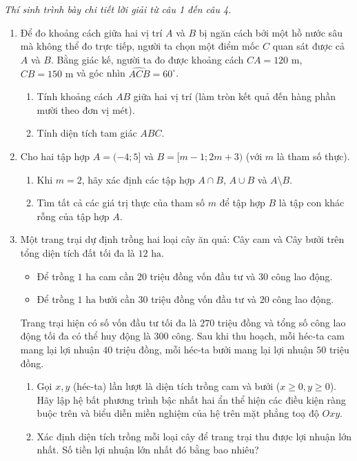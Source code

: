 \documentclass[12pt,a4paper]{article}
\newcommand{\parttitle}[1]{\par\vspace{1.5pt}\needspace{2\baselineskip}{\large\bfseries\color{ink}#1}\par\nopagebreak\vspace{1pt}}
\begin{document}
\parttitle{PHẦN IV. Tự luận}
\textit{Thí sinh trình bày chi tiết lời giải từ câu 1 đến câu 4.}
\begin{enumerate}
\item Để đo khoảng cách giữa hai vị trí $A$ và $B$ bị ngăn cách bởi một hồ nước sâu mà không thể đo trực tiếp, người ta chọn một điểm mốc $C$ quan sát được cả $A$ và $B$. Bằng giác kế, người ta đo được khoảng cách $CA = 120\text{ m}$, $CB = 150\text{ m}$ và góc nhìn $\widehat{ACB} = 60^\circ$.
\begin{enumerate}
    \item Tính khoảng cách $AB$ giữa hai vị trí (làm tròn kết quả đến hàng phần mười theo đơn vị mét).
    \item Tính diện tích tam giác $ABC$.
\end{enumerate}

\item Cho hai tập hợp $A = (-4; 5]$ và $B = [m - 1; 2m + 3)$ (với $m$ là tham số thực).
\begin{enumerate}
    \item Khi $m = 2$, hãy xác định các tập hợp $A \cap B$, $A \cup B$ và $A \setminus B$.
    \item Tìm tất cả các giá trị thực của tham số $m$ để tập hợp $B$ là tập con khác rỗng của tập hợp $A$.
\end{enumerate}

\item Một trang trại dự định trồng hai loại cây ăn quả: Cây cam và Cây bưởi trên tổng diện tích đất tối đa là $12\text{ ha}$.
\begin{itemize}[leftmargin=1.5em, itemsep=0.1pt]
    \item Để trồng $1\text{ ha}$ cam cần $20$ triệu đồng vốn đầu tư và $30$ công lao động.
    \item Để trồng $1\text{ ha}$ bưởi cần $30$ triệu đồng vốn đầu tư và $20$ công lao động.
\end{itemize}
Trang trại hiện có số vốn đầu tư tối đa là $270$ triệu đồng và tổng số công lao động tối đa có thể huy động là $300$ công. Sau khi thu hoạch, mỗi héc-ta cam mang lại lợi nhuận $40$ triệu đồng, mỗi héc-ta bưởi mang lại lợi nhuận $50$ triệu đồng.
\begin{enumerate}
    \item Gọi $x, y$ (héc-ta) lần lượt là diện tích trồng cam và bưởi ($x \ge 0, y \ge 0$). Hãy lập hệ bất phương trình bậc nhất hai ẩn thể hiện các điều kiện ràng buộc trên và biểu diễn miền nghiệm của hệ trên mặt phẳng toạ độ $Oxy$.
    \item Xác định diện tích trồng mỗi loại cây để trang trại thu được lợi nhuận lớn nhất. Số tiền lợi nhuận lớn nhất đó bằng bao nhiêu?
\end{enumerate}


\end{enumerate}
\end{document}
